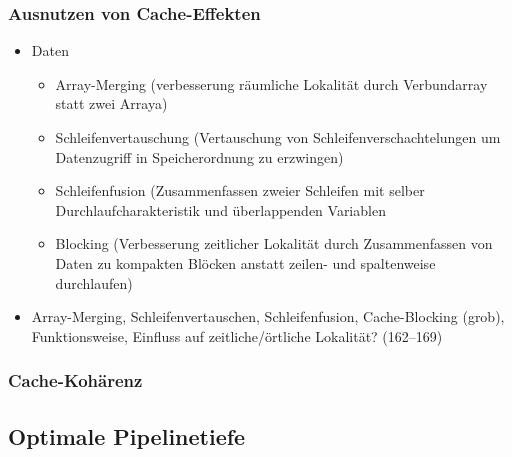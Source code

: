 \subsubsection{Ausnutzen von Cache-Effekten}
\begin{itemize}
	\item
		Daten
		\begin{itemize}
			\item
				Array-Merging (verbesserung räumliche Lokalität durch Verbundarray statt zwei Arraya)
			\item
				Schleifenvertauschung (Vertauschung von Schleifenverschachtelungen um Datenzugriff in Speicherordnung zu erzwingen)
			\item
				Schleifenfusion (Zusammenfassen zweier Schleifen mit selber Durchlaufcharakteristik und überlappenden Variablen
			\item
				Blocking (Verbesserung zeitlicher Lokalität durch Zusammenfassen von Daten zu kompakten Blöcken anstatt zeilen- und spaltenweise durchlaufen)

		\end{itemize}
	\item
		Array-Merging, Schleifenvertauschen, Schleifenfusion, Cache-Blocking (grob), Funktionsweise, Einfluss auf zeitliche/örtliche Lokalität? (162--169)
\end{itemize}

\subsubsection{Cache-Kohärenz}
\subsection{Optimale Pipelinetiefe}
